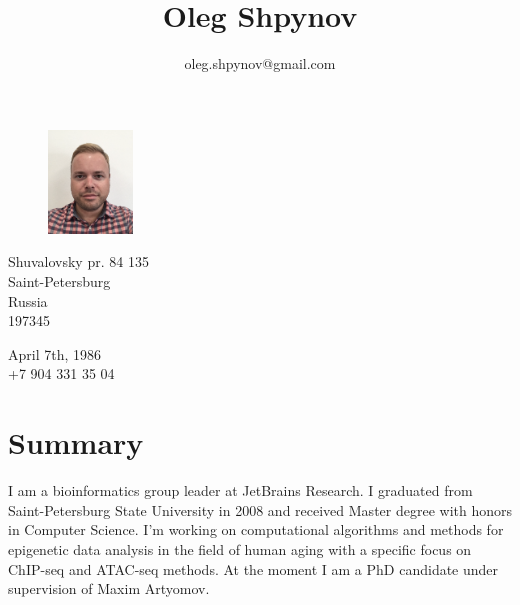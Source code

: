 \documentclass[11pt]{article}
\title{\bfseries\Huge Oleg Shpynov}
\author{oleg.shpynov@gmail.com}
\date{}
\begin{document}
\begin{figure}
    \vspace*{-4cm} %
	\hfill\includegraphics[width=0.20\textwidth]{me2020.png}
    \vspace*{-4cm} %
\end{figure}

\maketitle 

\begin{minipage}[ht]{0.4\textwidth}
Shuvalovsky pr. 84 135\\
Saint-Petersburg\\
Russia\\
197345
\end{minipage}
\begin{minipage}[ht]{0.3\textwidth}
April 7th, 1986\\
+7 904 331 35 04
\end{minipage}
\vspace{10pt}

\section*{Summary}
I am a bioinformatics group leader at JetBrains Research. I graduated from Saint-Petersburg State University in 2008 and received Master degree with honors in Computer Science. I'm working on computational algorithms and methods for epigenetic data analysis in the field of human aging with a specific focus on ChIP-seq and ATAC-seq methods. At the moment I am a PhD candidate under supervision of Maxim Artyomov.

\end{document}
